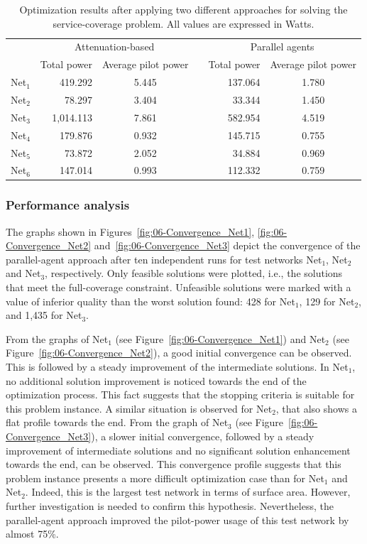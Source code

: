 \begin{table}
\caption{Optimization results after applying two different approaches for solving
the service-coverage problem. All values are expressed in Watts.\emph{\label{tab:06-Optimization_results}}}


\centering

\begin{tabular}{crccrc}
\toprule 
 & \multicolumn{2}{c}{Attenuation-based} &  & \multicolumn{2}{c}{Parallel agents}\tabularnewline\addlinespace
\cmidrule{2-3} \cmidrule{5-6} 
 & Total power & Average pilot power &  & Total power & Average pilot power\tabularnewline\addlinespace
\cmidrule{1-3} \cmidrule{5-6} 
Net$_{1}$ & 419.292 & 5.445 &  & 137.064 & 1.780\tabularnewline
Net$_{2}$ & 78.297 & 3.404 &  & 33.344 & 1.450\tabularnewline
Net$_{3}$ & 1,014.113 & 7.861 &  & 582.954 & 4.519\tabularnewline
Net$_{4}$ & 179.876 & 0.932 &  & 145.715 & 0.755\tabularnewline
Net$_{5}$ & 73.872 & 2.052 &  & 34.884 & 0.969\tabularnewline
Net$_{6}$ & 147.014 & 0.993 &  & 112.332 & 0.759\tabularnewline
\bottomrule
\end{tabular}
\end{table}



\subsubsection{Performance analysis}

The graphs shown in Figures~\ref{fig:06-Convergence_Net1}, \ref{fig:06-Convergence_Net2}
and~\ref{fig:06-Convergence_Net3} depict the convergence of the
parallel-agent approach after ten independent runs for test networks
Net$_{1}$, Net$_{2}$ and Net$_{3}$, respectively. Only feasible
solutions were plotted, i.e., the solutions that meet the full-coverage
constraint. Unfeasible solutions were marked with a value of inferior
quality than the worst solution found: 428 for Net$_{1}$, 129 for
Net$_{2}$, and 1,435 for Net$_{3}$.

From the graphs of Net$_{1}$ (see Figure~\ref{fig:06-Convergence_Net1})
and Net$_{2}$ (see Figure~\ref{fig:06-Convergence_Net2}), a good
initial convergence can be observed. This is followed by a steady
improvement of the intermediate solutions. In Net$_{1}$, no additional
solution improvement is noticed towards the end of the optimization
process. This fact suggests that the stopping criteria is suitable
for this problem instance. A similar situation is observed for Net$_{2}$,
that also shows a flat profile towards the end. From the graph of
Net$_{3}$ (see Figure~\ref{fig:06-Convergence_Net3}), a slower
initial convergence, followed by a steady improvement of intermediate
solutions and no significant solution enhancement towards the end,
can be observed. This convergence profile suggests that this problem
instance presents a more difficult optimization case than for Net$_{1}$
and Net$_{2}$. Indeed, this is the largest test network in terms
of surface area. However, further investigation is needed to confirm
this hypothesis. Nevertheless, the parallel-agent approach improved
the pilot-power usage of this test network by almost 75\%.

